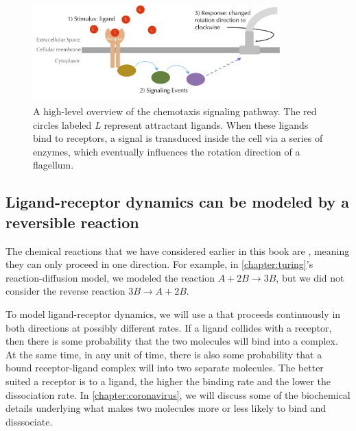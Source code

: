 \begin{figure}[h]
\centering
\mySfFamily
\includegraphics[width = 0.85\textwidth]{../images/chemotaxis_signal.png}
\caption{A high-level overview of the chemotaxis signaling pathway. The red circles labeled \textit{L} represent attractant ligands. When these ligands bind to receptors, a signal is transduced inside the cell via a series of enzymes, which eventually influences the rotation direction of a flagellum.}
\label{fig:chemotaxis_signal}
\end{figure}

\FloatBarrier
\nopagebreak
{}
\subsection{Ligand-receptor dynamics can be modeled by a reversible reaction}

The chemical reactions that we have considered earlier in this book are , meaning they can only proceed in one direction. For example, in \autoref{chapter:turing}'s reaction-diffusion model, we modeled the reaction $A + 2B \rightarrow 3B$, but we did not consider the reverse reaction $3B \rightarrow A + 2B$.

To model ligand-receptor dynamics, we will use a  that proceeds continuously in both directions at possibly different rates. If a ligand collides with a receptor, then there is some probability that the two molecules will bind into a complex. At the same time, in any unit of time, there is also some probability that a bound receptor-ligand complex will  into two separate molecules. The better suited a receptor is to a ligand, the higher the binding rate and the lower the dissociation rate. In \autoref{chapter:coronavirus}, we will discuss some of the biochemical details underlying what makes two molecules more or less likely to bind and disssociate.\\

